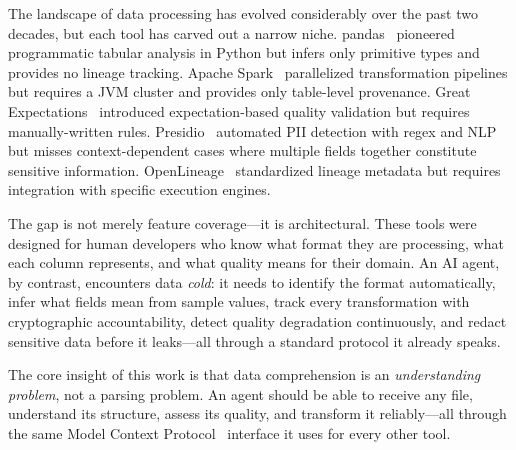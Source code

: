 \documentclass[10pt, twocolumn]{article}
\begin{document}
The landscape of data processing has evolved considerably over the past two decades, but each tool has carved out a narrow niche. pandas~\cite{mckinney2010pandas} pioneered programmatic tabular analysis in Python but infers only primitive types and provides no lineage tracking. Apache Spark~\cite{apachespark2024} parallelized transformation pipelines but requires a JVM cluster and provides only table-level provenance. Great Expectations~\cite{greatexpectations2024} introduced expectation-based quality validation but requires manually-written rules. Presidio~\cite{presidio2024} automated PII detection with regex and NLP but misses context-dependent cases where multiple fields together constitute sensitive information. OpenLineage~\cite{openlineage2024} standardized lineage metadata but requires integration with specific execution engines.

The gap is not merely feature coverage---it is architectural. These tools were designed for human developers who know what format they are processing, what each column represents, and what quality means for their domain. An AI agent, by contrast, encounters data \emph{cold}: it needs to identify the format automatically, infer what fields mean from sample values, track every transformation with cryptographic accountability, detect quality degradation continuously, and redact sensitive data before it leaks---all through a standard protocol it already speaks.

The core insight of this work is that data comprehension is an \emph{understanding problem}, not a parsing problem. An agent should be able to receive any file, understand its structure, assess its quality, and transform it reliably---all through the same Model Context Protocol~\cite{mcp2024spec} interface it uses for every other tool.
\end{document}
